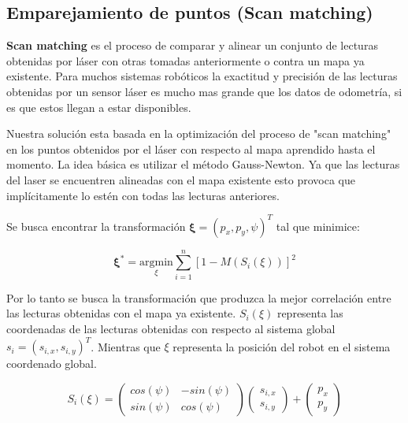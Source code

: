 \documentclass[10pt,a4paper]{article}
\begin{document}
\subsection{Emparejamiento de puntos (Scan matching)}

\textbf{Scan matching} es el proceso de comparar y alinear un conjunto de lecturas obtenidas por láser con otras tomadas anteriormente o contra un mapa ya existente. Para muchos sistemas robóticos la exactitud y precisión de las lecturas obtenidas por un sensor láser es mucho mas grande que los datos de odometría, si es que estos llegan a estar disponibles.

Nuestra solución esta basada en la optimización del proceso de "scan matching" en los puntos obtenidos por el láser con respecto al mapa aprendido hasta el momento. La idea básica es utilizar el método Gauss-Newton. Ya que las lecturas del laser se encuentren alineadas con el mapa existente esto provoca que implícitamente lo estén con todas las lecturas anteriores.

Se busca encontrar la transformación  $ \boldsymbol{\xi} = (p_{x}, p_{y}, \psi)^{T} $ tal que minimice:

\begin{equation}
\label{eq:eAsterisk}
	\boldsymbol{\xi}^{*} = 
		\underset{\xi}{\mathrm{argmin}} 
 		\sum_{i=1}^{n} [1 - M(S_{i}(\xi))]^{2}
\end{equation}

Por lo tanto se busca la transformación que produzca la mejor correlación entre las lecturas obtenidas con el mapa ya existente. $ S_{i}(\xi) $ representa las coordenadas de las lecturas obtenidas con respecto al sistema global $ s_{i} = (s_{i,x}, s_{i,y})^{T} $. Mientras que $ \xi $ representa la posición del robot en el sistema coordenado global.

\begin{equation}
\label{eq:SiE}
	S_{i}(\xi) = 
		\begin{pmatrix}
			cos(\psi) & -sin(\psi) \\
			sin(\psi) & cos(\psi)	
		\end{pmatrix}
		\begin{pmatrix}
			s_{i,x} \\ s_{i,y}
		\end{pmatrix} 
		+
		\begin{pmatrix}
			p_{x} \\ p_{y}
		\end{pmatrix}				
\end{equation}
\end{document}
